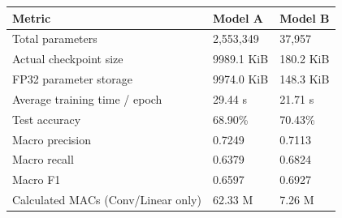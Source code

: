 \begin{tabular}{lll}
\toprule
Metric & Model A & Model B \\
\midrule
Total parameters & 2,553,349 & 37,957 \\
Actual checkpoint size & 9989.1 KiB & 180.2 KiB \\
FP32 parameter storage & 9974.0 KiB & 148.3 KiB \\
Average training time / epoch & 29.44 s & 21.71 s \\
Test accuracy & 68.90\% & 70.43\% \\
Macro precision & 0.7249 & 0.7113 \\
Macro recall & 0.6379 & 0.6824 \\
Macro F1 & 0.6597 & 0.6927 \\
Calculated MACs (Conv/Linear only) & 62.33 M & 7.26 M \\
\bottomrule
\end{tabular}
